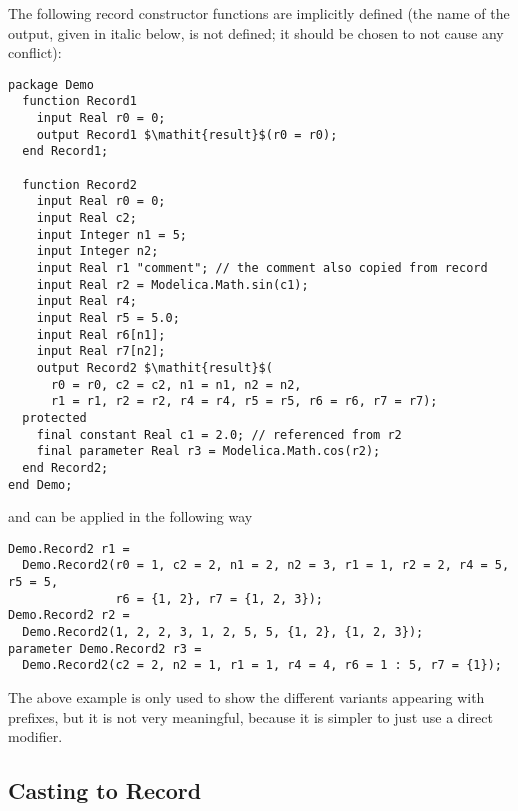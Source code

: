 \begin{nonnormative}
The following record constructor functions are implicitly defined
(the name of the output, given in italic below, is not defined; it
should be chosen to not cause any conflict):
\begin{lstlisting}[language=modelica,escapechar=!]
package Demo
  function Record1
    input Real r0 = 0;
    output Record1 $\mathit{result}$(r0 = r0);
  end Record1;

  function Record2
    input Real r0 = 0;
    input Real c2;
    input Integer n1 = 5;
    input Integer n2;
    input Real r1 "comment"; // the comment also copied from record
    input Real r2 = Modelica.Math.sin(c1);
    input Real r4;
    input Real r5 = 5.0;
    input Real r6[n1];
    input Real r7[n2];
    output Record2 $\mathit{result}$(
      r0 = r0, c2 = c2, n1 = n1, n2 = n2,
      r1 = r1, r2 = r2, r4 = r4, r5 = r5, r6 = r6, r7 = r7);
  protected
    final constant Real c1 = 2.0; // referenced from r2
    final parameter Real r3 = Modelica.Math.cos(r2);
  end Record2;
end Demo;
\end{lstlisting}
and can be applied in the following way
\begin{lstlisting}[language=modelica]
Demo.Record2 r1 =
  Demo.Record2(r0 = 1, c2 = 2, n1 = 2, n2 = 3, r1 = 1, r2 = 2, r4 = 5, r5 = 5,
               r6 = {1, 2}, r7 = {1, 2, 3});
Demo.Record2 r2 =
  Demo.Record2(1, 2, 2, 3, 1, 2, 5, 5, {1, 2}, {1, 2, 3});
parameter Demo.Record2 r3 =
  Demo.Record2(c2 = 2, n2 = 1, r1 = 1, r4 = 4, r6 = 1 : 5, r7 = {1});
\end{lstlisting}

The above example is only used to show the different variants
appearing with prefixes, but it is not very meaningful, because it is
simpler to just use a direct modifier.
\end{nonnormative}

\subsection{Casting to Record}\label{casting-to-record}

